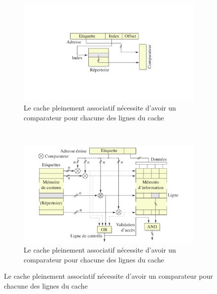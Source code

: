 \begin{figure}
    \centering
    \begin{subfigure}[b]{0.45\linewidth}
        \includegraphics[width=\linewidth]{images/cache_circuit-direct.png}
        \caption{Le cache pleinement associatif nécessite d'avoir un comparateur pour chacune des lignes du cache}
        \label{pic:cache_circuit-direct}
    \end{subfigure}
    ~ %
    \begin{subfigure}[b]{0.45\linewidth}
        \includegraphics[width=\linewidth]{images/cache_circuit-fully-associative.png}
        \caption{Le cache pleinement associatif nécessite d'avoir un comparateur pour chacune des lignes du cache}
        \label{pic:cache_circuit-fully-associative}
    \end{subfigure}
    

\end{figure}
